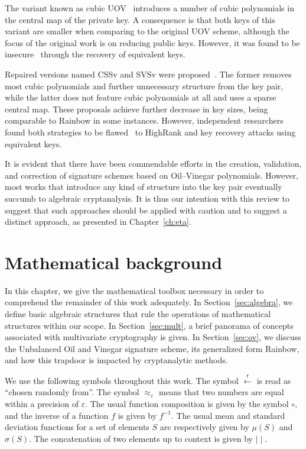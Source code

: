 \documentclass[12pt, a4paper, oneside]{memoir}
\newcommand{\random}{\overset{\mathsf{r}}{\gets}}
\theoremstyle{definition}
\begin{document}
The variant known as cubic UOV~\cite{Nie:201511} introduces a number of cubic polynomials in the central map of the private key. A consequence is that both keys of this variant are smaller when comparing to the original UOV scheme, although the focus of the original work is on reducing public keys. However, it was found to be insecure~\cite{Hashimoto:201712} through the recovery of equivalent keys. 

Repaired versions named CSSv and SVSv were proposed~\cite{Duong:201611}. The former removes most cubic polynomials and further unnecessary structure from the key pair, while the latter does not feature cubic polynomials at all and uses a sparse central map. These proposals achieve further decrease in key sizes, being comparable to Rainbow in some instances. However, independent researchers found both strategies to be flawed~\cite{Shim:201711,Hashimoto:201712} to HighRank and key recovery attacks using equivalent keys.

It is evident that there have been commendable efforts in the creation, validation, and correction of signature schemes based on Oil--Vinegar polynomials. However, most works that introduce any kind of structure into the key pair eventually succumb to algebraic cryptanalysis. It is thus our intention with this review to suggest that such approaches should be applied with caution and to suggest a distinct approach, as presented in Chapter~\ref{ch:eta}.

\chapter{Mathematical background}\label{ch:math}

In this chapter, we give the mathematical toolbox necessary in order to comprehend the remainder of this work adequately. In Section~\ref{sec:algebra}, we define basic algebraic structures that rule the operations of mathematical structures within our scope. In Section~\ref{sec:mult}, a brief panorama of concepts associated with multivariate cryptography is given. In Section~\ref{sec:ov}, we discuss the Unbalanced Oil and Vinegar signature scheme, its generalized form Rainbow, and how this trapdoor is impacted by cryptanalytic methods.

We use the following symbols throughout this work. The symbol $\random$ is read as ``chosen randomly from''. The symbol $\approx_{\varepsilon}$ means that two numbers are equal within a precision of $\varepsilon$. The usual function composition is given by the symbol $\circ$, and the inverse of a function $f$ is given by $f^{-1}$. The usual mean and standard deviation functions for a set of elements $S$ are respectively given by $\mu(S)$ and $\sigma(S)$. The concatenation of two elements up to context is given by $\mid\mid$.
\end{document}
